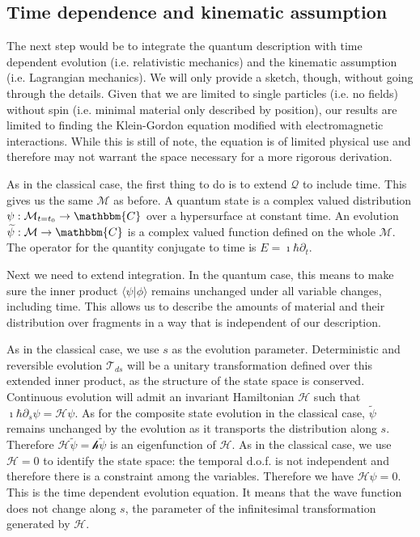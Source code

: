 \documentclass[aps,pra,10pt,twocolumn,floatfix,nofootinbib]{revtex4-1}
\numberwithin{equation}{section}
\theoremstyle{definition}
\begin{document}
\subsection{Time dependence and kinematic assumption}

The next step would be to integrate the quantum description with time dependent evolution (i.e. relativistic mechanics) and the kinematic assumption (i.e. Lagrangian mechanics). We will only provide a sketch, though, without going through the details. Given that we are limited to single particles (i.e. no fields) without spin (i.e. minimal material only described by position), our results are limited to finding the Klein-Gordon equation modified with electromagnetic interactions. While this is still of note, the equation is of limited physical use and therefore may not warrant the space necessary for a more rigorous derivation.

As in the classical case, the first thing to do is to extend $\mathcal{Q}$ to include time. This gives us the same $\mathcal{M}$ as before. A quantum state is a complex valued distribution $\psi : \mathcal{M}_{t=t_0} \rightarrow \mathbbm{C}$ over a hypersurface at constant time. An evolution $\widetilde{\psi} : \mathcal{M} \rightarrow \mathbbm{C}$ is a complex valued function defined on the whole $\mathcal{M}$. The operator for the quantity conjugate to time is $E=\imath\hbar\partial_t$.

Next we need to extend integration. In the quantum case, this means to make sure the inner product $\langle \psi | \phi \rangle$ remains unchanged under all variable changes, including time. This allows us to describe the amounts of material and their distribution over fragments in a way that is independent of our description.

As in the classical case, we use $s$ as the evolution parameter. Deterministic and reversible evolution $\mathcal{T}_{ds}$ will be a unitary transformation defined over this extended inner product, as the structure of the state space is conserved. Continuous evolution will admit an invariant Hamiltonian $\mathcal{H}$ such that $\imath \hbar \partial_s \psi = \mathcal{H} \psi$. As for the composite state evolution in the classical case, $\widetilde{\psi}$ remains unchanged by the evolution as it transports the distribution along $s$. Therefore $\mathcal{H} \widetilde{\psi} = \mathcal{h} \widetilde{\psi}$ is an eigenfunction of $\mathcal{H}$. As in the classical case, we use $\mathcal{H}=0$ to identify the state space: the temporal d.o.f. is not independent and therefore there is a constraint among the variables. Therefore we have $\mathcal{H} \psi = 0$. This is the time dependent evolution equation. It means that the wave function does not change along $s$, the parameter of the infinitesimal transformation generated by $\mathcal{H}$.
\end{document}

